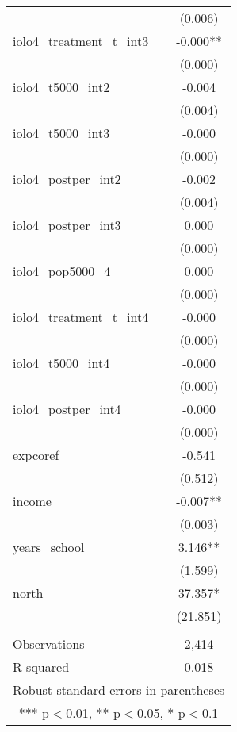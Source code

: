 \documentclass[]{article}
\begin{document}
\begin{tabular}{lc}
 & (0.006) \\
iolo4\_treatment\_t\_int3 & -0.000** \\
 & (0.000) \\
iolo4\_t5000\_int2 & -0.004 \\
 & (0.004) \\
iolo4\_t5000\_int3 & -0.000 \\
 & (0.000) \\
iolo4\_postper\_int2 & -0.002 \\
 & (0.004) \\
iolo4\_postper\_int3 & 0.000 \\
 & (0.000) \\
iolo4\_pop5000\_4 & 0.000 \\
 & (0.000) \\
iolo4\_treatment\_t\_int4 & -0.000 \\
 & (0.000) \\
iolo4\_t5000\_int4 & -0.000 \\
 & (0.000) \\
iolo4\_postper\_int4 & -0.000 \\
 & (0.000) \\
expcoref & -0.541 \\
 & (0.512) \\
income & -0.007** \\
 & (0.003) \\
years\_school & 3.146** \\
 & (1.599) \\
north & 37.357* \\
 & (21.851) \\
 &  \\
Observations & 2,414 \\
 R-squared & 0.018 \\ \hline
\multicolumn{2}{c}{ Robust standard errors in parentheses} \\
\multicolumn{2}{c}{ *** p$<$0.01, ** p$<$0.05, * p$<$0.1} \\
\end{tabular}
\end{document}

